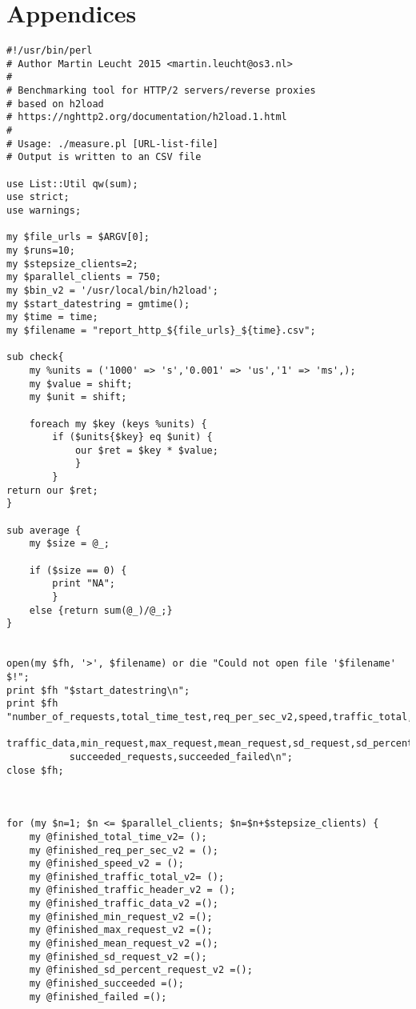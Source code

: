 \section*{Appendices}
\label{appendices}


\begin{lstlisting}
#!/usr/bin/perl 
# Author Martin Leucht 2015 <martin.leucht@os3.nl>
#
# Benchmarking tool for HTTP/2 servers/reverse proxies
# based on h2load 
# https://nghttp2.org/documentation/h2load.1.html
#
# Usage: ./measure.pl [URL-list-file]
# Output is written to an CSV file

use List::Util qw(sum);
use strict;
use warnings;

my $file_urls = $ARGV[0];
my $runs=10;
my $stepsize_clients=2;
my $parallel_clients = 750;
my $bin_v2 = '/usr/local/bin/h2load';
my $start_datestring = gmtime();
my $time = time;
my $filename = "report_http_${file_urls}_${time}.csv";

sub check{
	my %units = ('1000' => 's','0.001' => 'us','1' => 'ms',);
	my $value = shift;
	my $unit = shift;
	
	foreach my $key (keys %units) {
		if ($units{$key} eq $unit) {
			our $ret = $key * $value;
			}
		}		
return our $ret;
}

sub average {
	my $size = @_;
	
	if ($size == 0) {
		print "NA";
		}
	else {return sum(@_)/@_;}
}


open(my $fh, '>', $filename) or die "Could not open file '$filename' $!";
print $fh "$start_datestring\n";
print $fh "number_of_requests,total_time_test,req_per_sec_v2,speed,traffic_total,traffic_header,
		   traffic_data,min_request,max_request,mean_request,sd_request,sd_percent_request,
		   succeeded_requests,succeeded_failed\n";
close $fh;



for (my $n=1; $n <= $parallel_clients; $n=$n+$stepsize_clients) {  
	my @finished_total_time_v2= ();
    my @finished_req_per_sec_v2 = ();
    my @finished_speed_v2 = ();
    my @finished_traffic_total_v2= ();
    my @finished_traffic_header_v2 = ();
    my @finished_traffic_data_v2 =();
    my @finished_min_request_v2 =();
    my @finished_max_request_v2 =();
    my @finished_mean_request_v2 =();
    my @finished_sd_request_v2 =();
    my @finished_sd_percent_request_v2 =();
    my @finished_succeeded =();
    my @finished_failed =();




\end{lstlisting}
